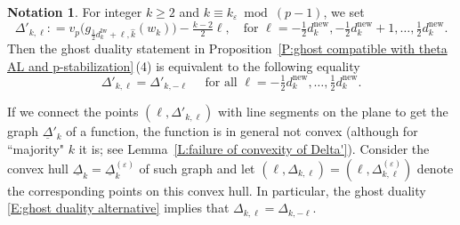 \documentclass[12pt]{amsart}
\newcommand{\liang}[1]{{\color{blue} \sf $\clubsuit\clubsuit\clubsuit$ Liang: [#1]}}
\theoremstyle{definition}
\newtheorem{remark}[subsection]{Remark}
\newtheorem{notation}[subsection]{Notation}
\numberwithin{equation}{subsection}
\def\ZZ{\mathbb{Z}}
\newcommand{\new}{\mathrm{new}}
\newcommand{\Iw}{\mathrm{Iw}}
\begin{document}
\begin{notation}
\label{N:Delta kell}
For integer $k \geq 2$ and $k \equiv k_\varepsilon \bmod{(p-1)}$, we set
\begin{equation}
\label{E:definition of Delta'}
\Delta'_{k, \ell} : = v_p \big(g_{\frac 12 d_{k}^\Iw+\ell, \hat k}(w_k) \big) -\tfrac{k-2}2 \ell, \quad \textrm{for }\ell = -\tfrac 12 d_{k}^\new, -\tfrac 12 d_{k}^\new+1, \dots, \tfrac 12d_{k}^{\new}.
\end{equation}
Then the ghost duality statement in Proposition~\ref{P:ghost compatible with theta AL and p-stabilization}\,(4) is equivalent to the following
equality
\begin{equation}
\label{E:ghost duality alternative}
\Delta'_{k,\ell} = \Delta'_{{k}, -\ell} \quad\textrm{ for all }\ell = -\tfrac 12 d_{k}^\new, \dots, \tfrac 12d_{k}^{\new}.
\end{equation}

If we connect the points $(\ell, \Delta'_{k,\ell})$ with line segments on the plane to get the graph $\underline \Delta'_k$ of a function, the function is in general not convex (although for ``majority" $k$ it is; see Lemma~\ref{L:failure of convexity of Delta'}). Consider the convex hull $\underline \Delta_k = \underline \Delta^{(\varepsilon)}_k$ of such graph and let $(\ell, \Delta_{k, \ell}) = (\ell, \Delta^{(\varepsilon)}_{k, \ell})$ denote the corresponding points on this convex hull. In particular, the ghost duality \eqref{E:ghost duality alternative} implies that $\Delta_{k,\ell} = \Delta_{k, -\ell}$.

\end{notation}

\end{document}
